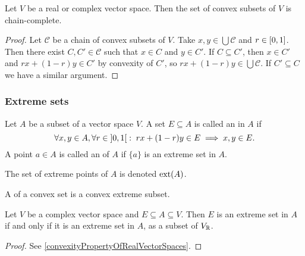 \begin{lemma} \label{convexSetsChainComplete}
Let $V$ be a real or complex vector space. Then the set of convex subsets of $V$ is chain-complete.
\end{lemma}
\begin{proof}
Let $\mathcal{C}$ be a chain of convex subsets of $V$. Take $x,y\in \bigcup \mathcal{C}$ and $r\in \interval{0,1}$. Then there exist $C, C'\in \mathcal{C}$ such that $x\in C$ and $y\in C'$. If $C\subseteq C'$, then $x\in C'$ and $rx+(1-r)y\in C'$ by convexity of $C'$, so $rx+(1-r)y\in \bigcup\mathcal{C}$. If $C'\subseteq C$ we have a similar argument.
\end{proof}

\subsubsection{Extreme sets}
\begin{definition}
Let $A$ be a subset of a vector space $V$. A set $E\subseteq A$ is called an  in $A$ if
\[ \forall x,y\in A, \forall r\in\interval[o]{0,1}: \; rx+(1-r)y\in E \implies x,y\in E. \]
A point $a\in A$ is called an  of $A$ if $\{a\}$ is an extreme set in $A$.

The set of extreme points of $A$ is denoted $\operatorname{ext}(A)$.

A  of a convex set is a convex extreme subset.
\end{definition}

\begin{lemma} \label{extremityPropertyOfRealVectorSpaces}
Let $V$ be a complex vector space and $E\subseteq A\subseteq V$. Then $E$ is an extreme set in $A$ \textup{if and only if} it is an extreme set in $A$, as a subset of $V_{\mathbb{R}}$.
\end{lemma}
\begin{proof}
See \ref{convexityPropertyOfRealVectorSpaces}.
\end{proof}

